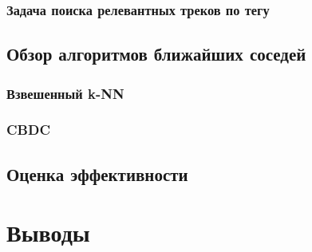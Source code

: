 \subsubsection{Задача поиска релевантных треков по тегу}

\subsection{Обзор алгоритмов ближайших соседей}
\subsubsection{Взвешенный k-NN}
\subsubsection{CBDC}
\subsection{Оценка эффективности}
\section{Выводы}





